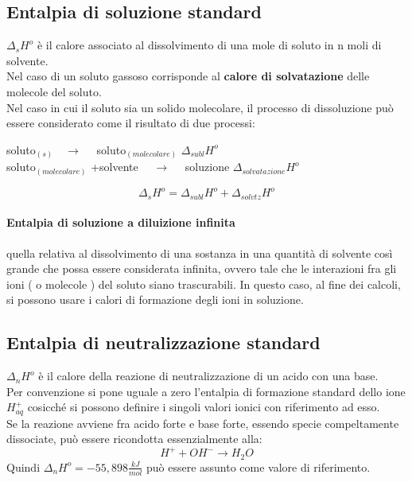 \documentclass{article}
\newcommand{\so}{\quad \rightarrow \quad}
\begin{document}
\subsection{Entalpia di soluzione standard}
$\Delta_sH^o$ è il calore associato al dissolvimento di una mole di soluto in n moli di solvente. \\
Nel caso di un soluto gassoso corrisponde al \textbf{calore di solvatazione} delle molecole del soluto.
\\Nel caso in cui il soluto sia un solido molecolare, il processo di dissoluzione può essere considerato come il risultato di due processi:
\begin{center}
    soluto$_{(s)} \so $ soluto$_{(molecolare)}$ $\Delta_{subl}H^o$ \\
    soluto$_{(molecolare)}$ +solvente $\so$ soluzione $\Delta_{solvatazione}H^o$
\end{center}
\begin{equation*}
    \Delta_sH^o=\Delta_{subl}H^o+\Delta_{solvtz}H^o
\end{equation*}
\paragraph{Entalpia di soluzione a diluizione infinita} quella relativa al dissolvimento di una sostanza in una quantità di solvente così grande che possa essere considerata infinita, ovvero tale che le interazioni fra gli ioni ( o molecole ) del soluto siano trascurabili. In questo caso, al fine dei calcoli, si possono usare i calori di formazione degli ioni in soluzione.

\subsection{Entalpia di neutralizzazione standard}$\Delta_nH^o$ è il calore della reazione di neutralizzazione di un acido con una base. \\
Per convenzione si pone uguale a zero l'entalpia di formazione standard dello ione $H_{aq}^+$ cosicché si possono definire i singoli valori ionici con riferimento ad esso. \\
Se la reazione avviene fra acido forte e base forte, essendo specie compeltamente dissociate, può essere ricondotta essenzialmente alla:
\begin{equation*}
    H^++OH^-\rightarrow H_2O
\end{equation*}
Quindi $\Delta_nH^o=-55,898 \frac{kJ}{mol}$ può essere assunto come valore di riferimento.
\end{document}
